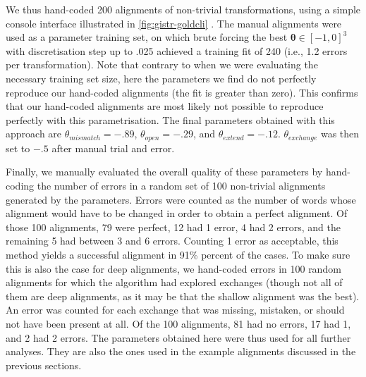 We thus hand-coded 200 alignments of non-trivial transformations, using
a simple console interface illustrated in \cref{fig:gistr-goldcli} 
. 
The
manual alignments were used as a parameter training set, on which brute
forcing the best \(\bm{\theta} \in [-1, 0]^3\) with discretisation step
up to .025 achieved a training fit of 240 (i.e., 1.2 errors per
transformation). Note that contrary to when we were evaluating the
necessary training set size, here the parameters we find do not
perfectly reproduce our hand-coded alignments (the fit is greater than
zero). This confirms that our hand-coded alignments are most likely not
possible to reproduce perfectly with this parametrisation. The final
parameters obtained with this approach are \(\theta_{mismatch} = -.89\),
\(\theta_{open} = -.29\), and \(\theta_{extend} = -.12\).
\(\theta_{exchange}\) was then set to \(-.5\) after manual trial and
error.

%

Finally, we manually evaluated the overall quality of these parameters
by hand-coding the number of errors in a random set of 100 non-trivial
alignments generated by the parameters. Errors were counted as the
number of words whose alignment would have to be changed in order to
obtain a perfect alignment. Of those 100 alignments, 79 were perfect, 12
had 1 error, 4 had 2 errors, and the remaining 5 had between 3 and 6
errors. Counting 1 error as acceptable, this method yields a successful
alignment in 91\% percent of the cases. To make sure this is also the
case for deep alignments, we hand-coded errors in 100 random alignments
for which the algorithm had explored exchanges (though not all of them
are deep alignments, as it may be that the shallow alignment was the
best). An error was counted for each exchange that was missing,
mistaken, or should not have been present at all. Of the 100 alignments,
81 had no errors, 17 had 1, and 2 had 2 errors. The parameters obtained
here were thus used for all further analyses. They are also the ones
used in the example alignments discussed in the previous sections.

